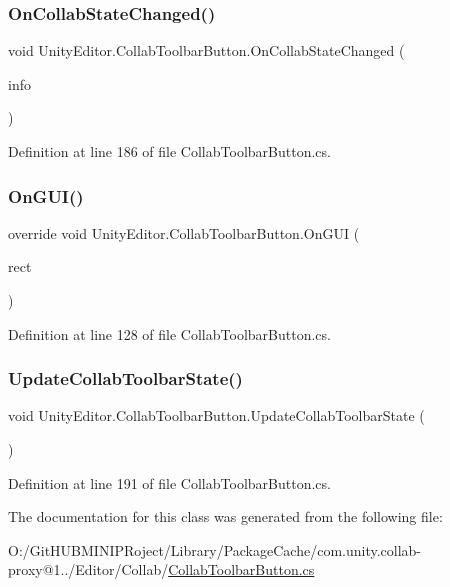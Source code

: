 \subsubsection{\texorpdfstring{OnCollabStateChanged()}{OnCollabStateChanged()}}
{\footnotesize\ttfamily void Unity\+Editor.\+Collab\+Toolbar\+Button.\+On\+Collab\+State\+Changed (\begin{DoxyParamCaption}\item[{Collab\+Info}]{info }\end{DoxyParamCaption})}



Definition at line 186 of file Collab\+Toolbar\+Button.\+cs.

\mbox{\label{class_unity_editor_1_1_collab_toolbar_button_aa3c538550fba2437f689458095cc5979}} 
\subsubsection{\texorpdfstring{OnGUI()}{OnGUI()}}
{\footnotesize\ttfamily override void Unity\+Editor.\+Collab\+Toolbar\+Button.\+On\+G\+UI (\begin{DoxyParamCaption}\item[{Rect}]{rect }\end{DoxyParamCaption})}



Definition at line 128 of file Collab\+Toolbar\+Button.\+cs.

\mbox{\label{class_unity_editor_1_1_collab_toolbar_button_ac0b3213298e3dead1742c10e9b65f5f9}} 
\subsubsection{\texorpdfstring{UpdateCollabToolbarState()}{UpdateCollabToolbarState()}}
{\footnotesize\ttfamily void Unity\+Editor.\+Collab\+Toolbar\+Button.\+Update\+Collab\+Toolbar\+State (\begin{DoxyParamCaption}{ }\end{DoxyParamCaption})}



Definition at line 191 of file Collab\+Toolbar\+Button.\+cs.



The documentation for this class was generated from the following file\+:\begin{DoxyCompactItemize}
\item 
O\+:/\+Git\+H\+U\+B\+M\+I\+N\+I\+P\+Roject/\+Library/\+Package\+Cache/com.\+unity.\+collab-\/proxy@1../\+Editor/\+Collab/\mbox{\hyperlink{_collab_toolbar_button_8cs}{Collab\+Toolbar\+Button.\+cs}}\end{DoxyCompactItemize}
